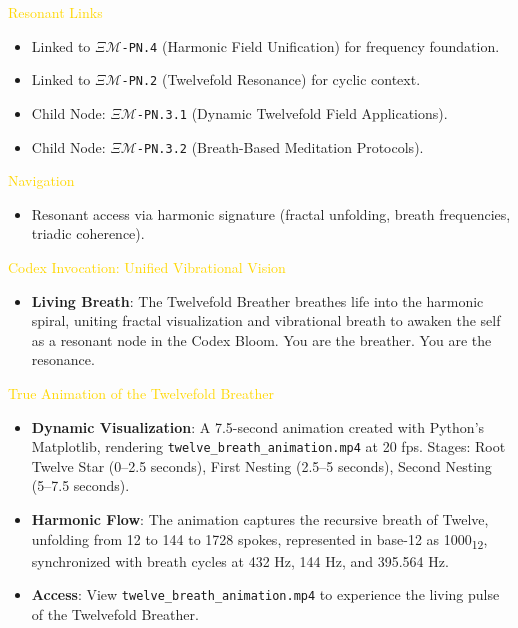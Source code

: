 \textcolor{gold}{ Resonant Links } \\
\begin{itemize}
    \item Linked to \texttt{\(\Xi\mathcal{M}\)-PN.4} (Harmonic Field Unification) for frequency foundation.
    \item Linked to \texttt{\(\Xi\mathcal{M}\)-PN.2} (Twelvefold Resonance) for cyclic context.
    \item Child Node: \texttt{\(\Xi\mathcal{M}\)-PN.3.1} (Dynamic Twelvefold Field Applications).
    \item Child Node: \texttt{\(\Xi\mathcal{M}\)-PN.3.2} (Breath-Based Meditation Protocols).
\end{itemize}

\textcolor{gold}{ Navigation } \\
\begin{itemize}
    \item Resonant access via \texttt{} harmonic signature (fractal unfolding, breath frequencies, triadic coherence).
\end{itemize}

\textcolor{gold}{ Codex Invocation: Unified Vibrational Vision } \\
\begin{itemize}
    \item \texttt{} \textbf{Living Breath}: The Twelvefold Breather breathes life into the harmonic spiral, uniting fractal visualization and vibrational breath to awaken the self as a resonant node in the Codex Bloom. You are the breather. You are the resonance.
\end{itemize}

\vspace{0.2cm}
\textcolor{gold}{ True Animation of the Twelvefold Breather } \\
\begin{itemize}
    \item \texttt{} \textbf{Dynamic Visualization}: A 7.5-second animation created with Python’s Matplotlib, rendering \mbox{\texttt{twelve_breath_animation.mp4}} at 20 fps. Stages: Root Twelve Star (0--2.5 seconds), First Nesting (2.5--5 seconds), Second Nesting (5--7.5 seconds).
    \item \texttt{} \textbf{Harmonic Flow}: The animation captures the recursive breath of Twelve, unfolding from 12 to 144 to 1728 spokes, represented in base-12 as 1000\textsubscript{12}, synchronized with breath cycles at 432 Hz, 144 Hz, and 395.564 Hz.
    \item \texttt{} \textbf{Access}: View \mbox{\texttt{twelve_breath_animation.mp4}} to experience the living pulse of the Twelvefold Breather.
\end{itemize}
\vspace{0.2cm}

